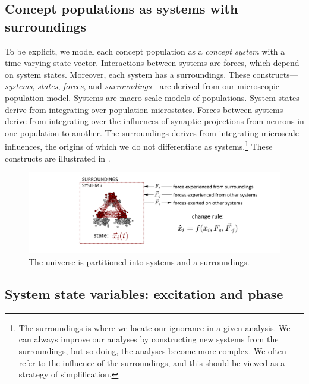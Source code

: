 \subsection{Concept populations as systems with surroundings} 

To be explicit, we model each concept population as a \textit{concept system} with a time-varying state vector. Interactions between systems are forces, which depend on system states. Moreover, each system has a surroundings. These constructs—\textit{systems}, \textit{states}, \textit{forces}, and \textit{surroundings}—are derived from our microscopic population model. Systems are macro-scale models of populations. System states derive from integrating over population microstates. Forces between systems derive from integrating over the influences of synaptic projections from neurons in one population to another. The surroundings derives from integrating microscale influences, the origins of which we do not differentiate as systems.\footnote{The surroundings is where we locate our ignorance in a given analysis. We can always improve our analyses by constructing new systems from the surroundings, but so doing, the analyses become more complex. We often refer to the influence of the surroundings, and this should be viewed as a strategy of simplification.} These constructs are illustrated in {}.

  
\begin{figure}
\includegraphics[width=\textwidth]{figures/Tilsen-img11.png}
\caption{The universe is partitioned into systems and a surroundings.}
\label{fig:2:4}
\end{figure}
 

\subsection{System state variables: excitation and phase}

